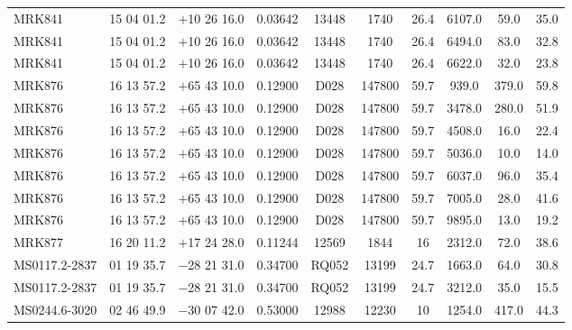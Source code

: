 \begin{landscape}
\begin{center}
\begin{longtable}{l c c c c c c c c c}
MRK841  &                  15 04 01.2  &         $+$10 26 16.0  &       0.03642  & 13448  &   1740  &       26.4  &      6107.0  &  59.0  &   35.0  \\
MRK841  &                  15 04 01.2  &         $+$10 26 16.0  &       0.03642  & 13448  &   1740  &       26.4  &      6494.0  &  83.0  &   32.8  \\
MRK841  &                  15 04 01.2  &         $+$10 26 16.0  &       0.03642  & 13448  &   1740  &       26.4  &      6622.0  &  32.0  &   23.8  \\
MRK876  &                  16 13 57.2  &         $+$65 43 10.0  &       0.12900  & D028  &    147800  &     59.7  &      939.0  &   379.0  &  59.8  \\
MRK876  &                  16 13 57.2  &         $+$65 43 10.0  &       0.12900  & D028  &    147800  &     59.7  &      3478.0  &  280.0  &  51.9  \\
MRK876  &                  16 13 57.2  &         $+$65 43 10.0  &       0.12900  & D028  &    147800  &     59.7  &      4508.0  &  16.0  &   22.4  \\
MRK876  &                  16 13 57.2  &         $+$65 43 10.0  &       0.12900  & D028  &    147800  &     59.7  &      5036.0  &  10.0  &   14.0  \\
MRK876  &                  16 13 57.2  &         $+$65 43 10.0  &       0.12900  & D028  &    147800  &     59.7  &      6037.0  &  96.0  &   35.4  \\
MRK876  &                  16 13 57.2  &         $+$65 43 10.0  &       0.12900  & D028  &    147800  &     59.7  &      7005.0  &  28.0  &   41.6  \\
MRK876  &                  16 13 57.2  &         $+$65 43 10.0  &       0.12900  & D028  &    147800  &     59.7  &      9895.0  &  13.0  &   19.2  \\
MRK877  &                  16 20 11.2  &         $+$17 24 28.0  &       0.11244  & 12569  &   1844  &       16  &        2312.0  &  72.0  &   38.6  \\
MS0117.2-2837  &           01 19 35.7  &         $-$28 21 31.0  &       0.34700  & RQ052  &   13199  &      24.7  &      1663.0  &  64.0  &   30.8  \\
MS0117.2-2837  &           01 19 35.7  &         $-$28 21 31.0  &       0.34700  & RQ052  &   13199  &      24.7  &      3212.0  &  35.0  &   15.5  \\
MS0244.6-3020  &           02 46 49.9  &         $-$30 07 42.0  &       0.53000  & 12988  &   12230  &      10  &        1254.0  &  417.0  &  44.3  \\

\end{longtable}
\end{center}
\end{landscape}
